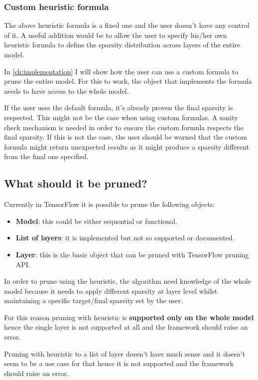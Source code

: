 \subsubsection{Custom heuristic formula}
The above heuristic formula is a fixed one and the user doesn't have any
control of it. A useful addition would be to allow the user to specify his/her
own heuristic formula to define the sparsity distribution across layers of the
entire model.

In \autoref{ch:implementation} I will show how the user can use a custom
formula to prune the entire model. For this to work, the object that implements
the formula needs to have access to the whole model.

If the user uses the default formula, it's already proven the final sparsity is
respected. This might not be the case when using custom formulas.
A sanity check mechanism is needed in order to ensure the custom formula
respects the final sparsity. If this is not the case, the user should be warned
that the custom formula might return unexpected results as it might produce a
sparsity different from the final one specified.

\subsection{What should it be pruned?}
Currently in TensorFlow it is possible to prune the following objects:
\begin{itemize}
    \item \textbf{Model}: this could be either sequential or functional.
    \item \textbf{List of layers}: it is implemented but not so supported or
        documented.
    \item \textbf{Layer}: this is the basic object that can be pruned with
        TensorFlow pruning API\@.
\end{itemize}

In order to prune using the heuristic, the algorithm need knowledge of the
whole model because it needs to apply different sparsity at layer level whilst
maintaining a specific target/final sparsity set by the user.

For this reason pruning with heuristic is \textbf{supported only on the whole
model} hence the single layer is not supported at all and the framework should
raise an error.

Pruning with heuristic to a list of layer doesn't have much sense and it
doesn't seem to be a use case for that hence it is not supported and the
framework should raise an error.

